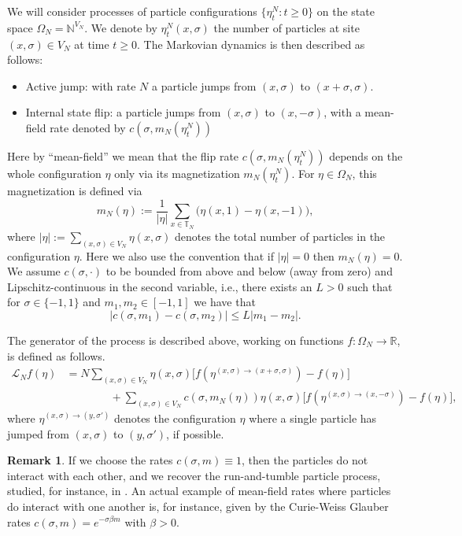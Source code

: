 \documentclass[11pt]{article}
\numberwithin{equation}{section}
\theoremstyle{definition}
\newtheorem{Remark}{Remark}[section]
\theoremstyle{plain}
\newcommand{\nn}{\nonumber}
\begin{document}
We will consider processes of particle configurations $\{\eta^N_t:t\geq 0\}$ on the state space $\Omega_N = \mathbb{N}^{V_N}$. We denote by  $\eta^N_t(x,\sigma)$ the number of particles at site $(x,\sigma) \in V_N$ at time $t\geq 0$.  The Markovian dynamics is then described as follows:
\begin{itemize}
\item [i)] Active jump:
with rate $N$ a particle jumps from $(x,\sigma)$ to $(x+\sigma,\sigma)$.
\item[ii)] Internal state flip: a particle jumps from $(x,\sigma)$ to $(x,-\sigma)$, with a mean-field rate denoted by $c(\sigma, m_N(\eta_t^N))$
\end{itemize}
Here by ``mean-field'' we mean that the flip rate 
$c(\sigma, m_N(\eta_t^N))$ depends on the whole configuration $\eta$ only via its magnetization $m_N(\eta_t^N)$.
For $\eta\in\Omega_N$, this magnetization is defined via
 \begin{equation}\label{magn def}
        m_N(\eta) := \frac{1}{|\eta|} \sum_{x \in \mathbb{T}_N} \big(\eta(x,1) - \eta(x,-1)\big),
\end{equation}
where $|\eta|:= \sum_{(x,\sigma) \in V_N} \eta(x,\sigma)$ denotes the total number of particles in the configuration $\eta$. Here we also use the convention that if $|\eta|=0$ then $m_N(\eta)=0$.  We assume $c(\sigma, \cdot)$ to be bounded from above and below (away from zero) and Lipschitz-continuous in the second variable, i.e., there exists an $L>0$ such that for $\sigma \in \{-1,1\}$ and $m_1,m_2 \in [-1,1]$ we have that 
\begin{equation}
    |c(\sigma,m_1) - c(\sigma,m_2)| \leq L|m_1-m_2|.
\end{equation}

The generator of the process is described above,
working on functions $f:\Omega_N \to \mathbb{R}$, is defined as follows.
    \begin{align}\label{gen}
        \mathscr{L}_Nf(\eta) 
        &\nn= N\sum_{(x,\sigma)\in V_N} \eta(x,\sigma)\big[f(\eta^{(x,\sigma)\to (x+\sigma,\sigma)}) - f(\eta)\big]\\
        &\qquad \qquad  + \sum_{(x,\sigma)\in V_N} c(\sigma,m_N(\eta)) \eta(x,\sigma)\big[f(\eta^{(x,\sigma)\to(x,-\sigma)})-f(\eta)\big],
    \end{align}
where $\eta^{(x,\sigma) \to (y,\sigma')}$ denotes the configuration $\eta$ where a single particle has jumped from $(x,\sigma)$ to $(y,\sigma')$, if possible.

\begin{Remark}
    If we choose the rates $c(\sigma,m) \equiv 1$, then the particles do not interact with each other, and we recover the run-and-tumble particle process, studied, for instance, in \cite{Tailleur, hidde-ergodic, Hidde-Fluctuations, Ginkel, demaerel2018active}. An actual example of mean-field rates where particles do interact with one another is, for instance, given by the Curie-Weiss Glauber rates $c(\sigma,m) = e^{-\sigma \beta m}$ with $\beta>0$.
\end{Remark}
\end{document}
